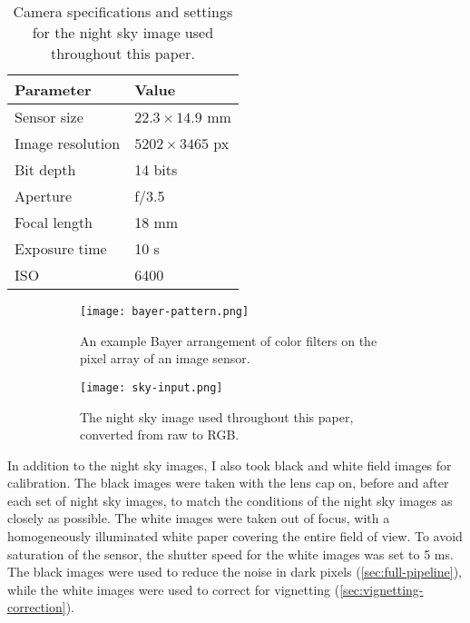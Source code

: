 \begin{table}[tb]
  \centering
  \begin{tabular}{ll}
    \toprule
    \textbf{Parameter} & \textbf{Value}        \\
    \midrule
    Sensor size        & $22.3 \times 14.9$ mm \\
    Image resolution   & $5202 \times 3465$ px \\
    Bit depth          & 14 bits               \\
    Aperture           & f/3.5                 \\
    Focal length       & 18 mm                 \\
    Exposure time      & 10 s                  \\
    ISO                & 6400                  \\
    \bottomrule
  \end{tabular}
  \caption{Camera specifications and settings for the night sky image used throughout this paper.}
  \label{tab:camera-settings}
\end{table}

\begin{figure}[tb]
  \centering
  \begin{subfigure}{.45\textwidth}
    \centering
    \texttt{[image: bayer-pattern.png]}
    \caption{An example Bayer arrangement of color filters on the pixel array of an image sensor.}
    \label{fig:bayer-pattern}
  \end{subfigure}%
  \hfill
  \begin{subfigure}{.45\textwidth}
    \centering
    \texttt{[image: sky-input.png]}
    \caption{The night sky image used throughout this paper, converted from raw to RGB.}
    \label{fig:sky-input}
  \end{subfigure}
  \caption{}
\end{figure}

In addition to the night sky images, I also took black and white field images for
calibration. The black images were taken with the lens cap on, before and after each set
of night sky images, to match the conditions of the night sky images as closely as
possible. The white images were taken out of focus, with a homogeneously illuminated white
paper covering the entire field of view. To avoid saturation of the sensor, the shutter
speed for the white images was set to 5 ms. The black images were used to reduce the noise
in dark pixels (\autoref{sec:full-pipeline}), while the white images were used to correct
for vignetting (\autoref{sec:vignetting-correction}).

